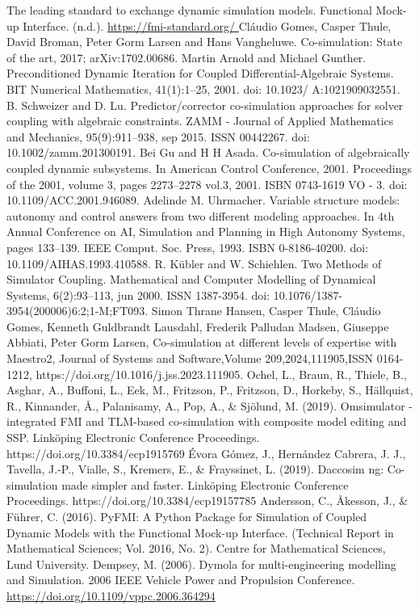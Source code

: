 \begin{thebibliography}{1}
   The leading standard to exchange dynamic simulation models. Functional Mock-up Interface. (n.d.). \url{https://fmi-standard.org/ }
   Cláudio Gomes, Casper Thule, David Broman, Peter Gorm Larsen and Hans Vangheluwe. Co-simulation: State of the art, 2017; arXiv:1702.00686.
  Martin Arnold and Michael Gunther. Preconditioned Dynamic Iteration for Coupled Differential-Algebraic Systems. BIT Numerical Mathematics, 41(1):1–25, 2001. doi: 10.1023/ A:1021909032551.
  B. Schweizer and D. Lu. Predictor/corrector co-simulation approaches for solver coupling with algebraic constraints. ZAMM - Journal of Applied Mathematics and Mechanics, 95(9):911–938, sep 2015. ISSN 00442267. doi: 10.1002/zamm.201300191.
   Bei Gu and H H Asada. Co-simulation of algebraically coupled dynamic subsystems. In American Control Conference, 2001. Proceedings of the 2001, volume 3, pages 2273–2278 vol.3, 2001. ISBN 0743-1619 VO - 3. doi: 10.1109/ACC.2001.946089.
   Adelinde M. Uhrmacher. Variable structure models: autonomy and control answers from two different modeling approaches. In 4th Annual Conference on AI, Simulation and Planning in High Autonomy Systems, pages 133–139. IEEE Comput. Soc. Press, 1993. ISBN 0-8186-40200. doi: 10.1109/AIHAS.1993.410588.
  R. Kübler and W. Schiehlen. Two Methods of Simulator Coupling. Mathematical and Computer Modelling of Dynamical Systems, 6(2):93–113, jun 2000. ISSN 1387-3954. doi: 10.1076/1387-3954(200006)6:2;1-M;FT093.
  Simon Thrane Hansen, Casper Thule, Cláudio Gomes, Kenneth Guldbrandt Lausdahl, Frederik Palludan Madsen, Giuseppe Abbiati, Peter Gorm Larsen,
  Co-simulation at different levels of expertise with Maestro2,
  Journal of Systems and Software,Volume 209,2024,111905,ISSN 0164-1212,
  https://doi.org/10.1016/j.jss.2023.111905.
  Ochel, L., Braun, R., Thiele, B., Asghar, A., Buffoni, L., Eek, M., Fritzson, P., Fritzson, D., Horkeby, S., Hällquist, R., Kinnander, Å., Palanisamy, A., Pop, A., \& Sjölund, M. (2019). Omsimulator - integrated FMI and TLM-based co-simulation with composite model editing and SSP. Linköping Electronic Conference Proceedings. https://doi.org/10.3384/ecp1915769 
  Évora Gómez, J., Hernández Cabrera, J. J., Tavella, J.-P., Vialle, S., Kremers, E., \& Frayssinet, L. (2019). Daccosim ng: Co-simulation made simpler and faster. Linköping Electronic Conference Proceedings. https://doi.org/10.3384/ecp19157785
  Andersson, C., Åkesson, J., \& Führer, C. (2016). PyFMI: A Python Package for Simulation of Coupled Dynamic Models with the Functional Mock-up Interface. (Technical Report in Mathematical Sciences; Vol. 2016, No. 2). Centre for Mathematical Sciences, Lund University.
  Dempsey, M. (2006). Dymola for multi-engineering modelling and Simulation. 2006 IEEE Vehicle Power and Propulsion Conference. \url{https://doi.org/10.1109/vppc.2006.364294 }


\end{thebibliography}
